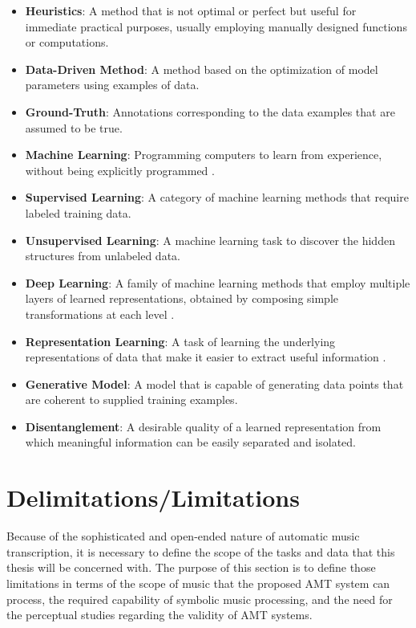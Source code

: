 \begin{itemize}
	\item \textbf{Heuristics}: A method that is not optimal or perfect but useful for immediate practical purposes, usually employing manually designed functions or computations.
	\item \textbf{Data-Driven Method}: A method based on the optimization of model parameters using examples of data.
	\item \textbf{Ground-Truth}: Annotations corresponding to the data examples that are assumed to be true.
	\item \textbf{Machine Learning}: Programming computers to learn from experience, without being explicitly programmed \cite{samuel1959ml}.
	\item \textbf{Supervised Learning}: A category of machine learning methods that require labeled training data.
	\item \textbf{Unsupervised Learning}: A machine learning task to discover the hidden structures from unlabeled data.
	\item \textbf{Deep Learning}: A family of machine learning methods that employ multiple layers of learned representations, obtained by composing simple transformations at each level \cite{lecun2015deeplearning}.
	\item \textbf{Representation Learning}: A task of learning the underlying representations of data that make it easier to extract useful information \cite{bengio2013representation}.
	\item \textbf{Generative Model}: A model that is capable of generating data points that are coherent to supplied training examples.
	\item \textbf{Disentanglement}: A desirable quality of a learned representation from which meaningful information can be easily separated and isolated.
\end{itemize}

\section{Delimitations/Limitations}\label{sec:limitations}

Because of the sophisticated and open-ended nature of automatic music transcription, it is necessary to define the scope of the tasks and data that this thesis will be concerned with.
The purpose of this section is to define those limitations in terms of the scope of music that the proposed AMT system can process, the required capability of symbolic music processing, and the need for the perceptual studies regarding the validity of AMT systems.


